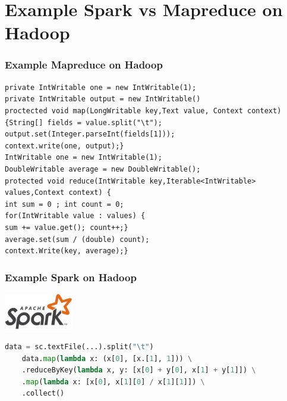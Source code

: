 
\section{Example Spark vs Mapreduce on Hadoop}
\begin{frame}[fragile]
	\frametitle{Example Mapreduce on Hadoop}

\begin{lstlisting}[style=myScalastyle, caption=Java Mapreduce Average Example]
private IntWritable one = new IntWritable(1);
private IntWritable output = new IntWritable()
proctected void map(LongWritable key,Text value, Context context) 
{String[] fields = value.split("\t");
output.set(Integer.parseInt(fields[1]));
context.write(one, output);}
IntWritable one = new IntWritable(1);
DoubleWritable average = new DoubleWritable();
protected void reduce(IntWritable key,Iterable<IntWritable> values,Context context) {
int sum = 0 ; int count = 0;
for(IntWritable value : values) {
sum += value.get(); count++;}
average.set(sum / (double) count);
context.Write(key, average);}
\end{lstlisting}

%
\end{frame}

\begin{frame}[fragile]
	\frametitle{Example Spark on Hadoop}
	\includegraphics[width=3cm]{Graphics/spark.jpg}
	
	
\begin{lstlisting}[language=Python, caption=Python Spark Average Example]
	data = sc.textFile(...).split("\t")
	data.map(lambda x: (x[0], [x.[1], 1])) \
	.reduceByKey(lambda x, y: [x[0] + y[0], x[1] + y[1]]) \
	.map(lambda x: [x[0], x[1][0] / x[1][1]]) \
	.collect()	
\end{lstlisting}

\end{frame}

